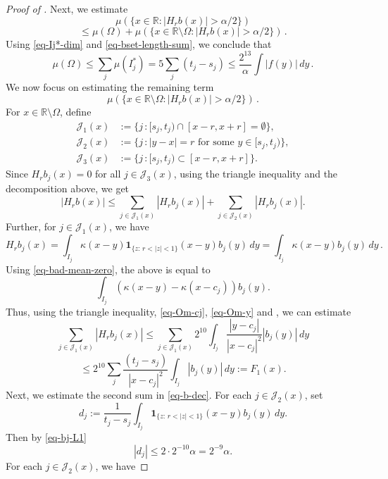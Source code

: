 \begin{proof}[Proof of ]
Next, we estimate
$$\mu\left(\{x\in \mathbb{R}: |H_r b(x)|>\alpha/2\}\right) $$
$$
    \le \mu (\Omega) + \mu\left(\{x\in \mathbb{R}\setminus\Omega: |H_r b(x)|>{\alpha}/2\}\right)\,.
$$
Using \eqref{eq-Ij*-dim} and \eqref{eq-bset-length-sum}, we conclude that
\begin{equation}
    \label{eq-omega-bd}
    \mu(\Omega) \le \sum_{j} \mu (I_j^*)
    = 5 \sum_{j} (t_j-s_j)\leq \frac{2^{13}}{\alpha} \int |f(y)|\, dy\,.
\end{equation}
We now focus on estimating the remaining term
$$\mu\left(\{x\in \mathbb{R}\setminus\Omega: |H_r b(x)|>{\alpha}/2\}\right)\,.$$
For $x\in \mathbb{R}\setminus\Omega$, define
\begin{align*}
    \mathcal{J}_1(x)&:=\{j\,:[s_j, t_j)\cap [x-r, x+r]=\emptyset \},\\
    \mathcal{J}_2(x)&:=\{j\,: |y-x|=r \text{ for some } y \in [s_j, t_j)\},\\
    \mathcal{J}_3(x)&:=\{j\,: [s_j, t_j)\subset [x-r, x+r]\}.
\end{align*}
Since $H_rb_j(x)=0$ for all $j\in \mathcal{J}_3(x)$, using the triangle inequality and the decomposition above, we get
\begin{equation}
    \label{eq-b-dec}
    |H_r b(x)|\leq \sum_{j\in \mathcal{J}_1(x)} |H_rb_j(x)|+\sum_{j\in \mathcal{J}_2(x)} |H_rb_j(x)|.
\end{equation}
Further, for $j\in \mathcal{J}_1(x)$, we have
$$H_rb_j(x)=\int_{I_j} \kappa (x-y)\mathbf{1}_{\{z:\, r<|z|<1\}}(x-y) b_j(y)\,dy=\int_{I_j} \kappa (x-y) b_j(y)\,dy\,.$$
Using \eqref{eq-bad-mean-zero}, the above is equal to
$$\int_{I_j} (\kappa (x-y)-\kappa(x-c_j)) b_j(y).$$
Thus, using the triangle inequality, \eqref{eq-Om-cj}, \eqref{eq-Om-y} and , we can estimate
$$\sum_{j\in \mathcal{J}_1(x)} |H_rb_j(x)|\leq \sum_{j\in \mathcal{J}_1(x)}2^{10}\int_{I_j}\frac{|y-c_j|}{|x-c_j|^2} |b_j(y)|\, dy$$
\begin{equation}
    \label{eq-J1-diff-est}
    \leq 2^{10}\sum_{j} \frac{(t_j-s_j)}{|x-c_j|^2}\int_{I_j} |b_j(y)|\, dy:=F_1(x).
\end{equation}
Next, we estimate the second sum in \eqref{eq-b-dec}. For each $j\in \mathcal{J}_2(x)$, set
$$d_j:=\frac{1}{t_j-s_j}\int_{I_j} \mathbf{1}_{\{z:\, r<|z|<1\}}(x-y) b_j(y)\, dy.$$
Then by \eqref{eq-bj-L1}
\begin{equation}
    \label{eq-dj-est}
    |d_j|\leq 2\cdot 2^{-10} \alpha=2^{-9}\alpha.
\end{equation}
For each $j\in \mathcal{J}_2(x)$, we have

\end{proof}

